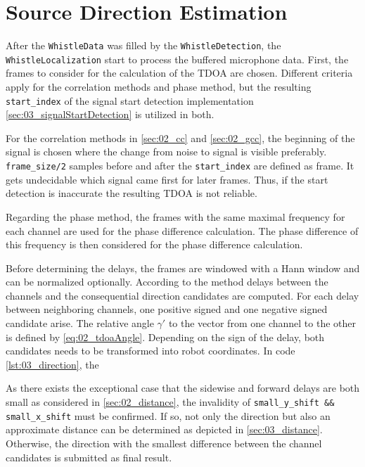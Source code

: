 \section{Source Direction Estimation}
\label{sec:03_direction}

After the \lstinline!WhistleData! was filled by the \lstinline!WhistleDetection!,
the \lstinline!WhistleLocalization! start to process the buffered microphone data.
First, the frames to consider for the calculation of the \ac{TDOA} are chosen.
Different criteria apply for the correlation methods and phase method, but the
resulting \lstinline!start_index! of the signal start detection implementation
\cref{sec:03_signalStartDetection} is utilized in both.

For the correlation methods in \cref{sec:02_cc} and \cref{sec:02_gcc}, the beginning
of the signal is chosen where the change from noise to signal is visible preferably.
\lstinline!frame_size/2! samples before and after the \lstinline!start_index! are defined
as frame.
It gets undecidable which signal came first for later frames. Thus, if the start detection
is inaccurate the resulting \ac{TDOA} is not reliable.

Regarding the phase method,
the frames with the same maximal frequency for each channel are used for the
phase difference calculation.
The phase difference of this frequency is then considered for the phase difference
calculation. %

Before determining the delays, the frames are windowed with a Hann window and can be
normalized optionally.
According to the method delays between the channels and the consequential direction
candidates are computed.
For each delay between neighboring channels, one positive signed and one negative
signed candidate arise.
The relative angle $\gamma'$ to the vector from one channel to the other is defined
by \cref{eq:02_tdoaAngle}.
Depending on the sign of the delay, both candidates needs to be transformed
into robot coordinates.
In code \ref{lst:03_direction}, the 


As there exists the exceptional case that the sidewise and forward delays are both small
as considered in \cref{sec:02_distance}, the invalidity of
\lstinline!small_y_shift && small_x_shift! must be confirmed.
If so, not only the direction but also an approximate distance can be determined
as depicted in \cref{sec:03_distance}.
Otherwise, the direction with the smallest difference between the channel
candidates is submitted as final result.
